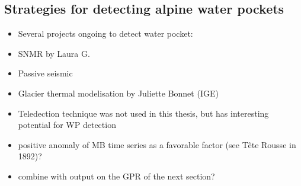 




\subsection{ Strategies for detecting alpine water pockets}

\begin{itemize}
    \item Several projects ongoing to detect water pocket:
    \item SNMR by Laura G.
    \item Passive seismic
    \item Glacier thermal modelisation by Juliette Bonnet (IGE)
    \item Teledection technique was not used in this thesis, but has interesting potential for WP detection
    \item positive anomaly of MB time series as a favorable factor (see Tête Rousse in 1892)?
    \item combine with output on the GPR of the next section?
\end{itemize}



